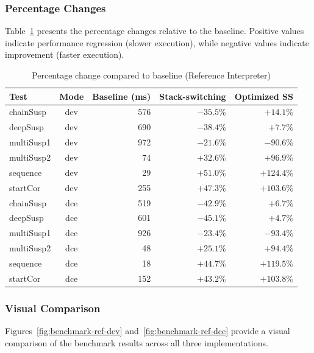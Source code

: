 \subsubsection*{Percentage Changes}

Table~\ref{tab:benchmark-ref-percentage} presents the percentage changes relative to the baseline. Positive values indicate
performance regression (slower execution), while negative values indicate improvement (faster execution).

\begin{table}[H]
\centering
\caption{Percentage change compared to baseline (Reference Interpreter)}
\label{tab:benchmark-ref-percentage}
\begin{tabular}{|l|c|r|r|r|}
\hline
\textbf{Test} & \textbf{Mode} & \textbf{Baseline (ms)} & \textbf{Stack-switching} & \textbf{Optimized SS} \\
\hline
chainSusp & dev & 576 & $-35.5\%$ & $+14.1\%$ \\
deepSusp & dev & 690 & $-38.4\%$ & $+7.7\%$ \\
multiSusp1 & dev & 972 & $-21.6\%$ & $-90.6\%$ \\
multiSusp2 & dev & 74 & $+32.6\%$ & $+96.9\%$ \\
sequence & dev & 29 & $+51.0\%$ & $+124.4\%$ \\
startCor & dev & 255 & $+47.3\%$ & $+103.6\%$ \\
\hline
chainSusp & dce & 519 & $-42.9\%$ & $+6.7\%$ \\
deepSusp & dce & 601 & $-45.1\%$ & $+4.7\%$ \\
multiSusp1 & dce & 926 & $-23.4\%$ & $-93.4\%$ \\
multiSusp2 & dce & 48 & $+25.1\%$ & $+94.4\%$ \\
sequence & dce & 18 & $+44.7\%$ & $+119.5\%$ \\
startCor & dce & 152 & $+43.2\%$ & $+103.8\%$ \\
\hline
\end{tabular}
\end{table}

\subsubsection*{Visual Comparison}

Figures~\ref{fig:benchmark-ref-dev} and~\ref{fig:benchmark-ref-dce} provide a visual comparison of the benchmark results across
all three implementations.


